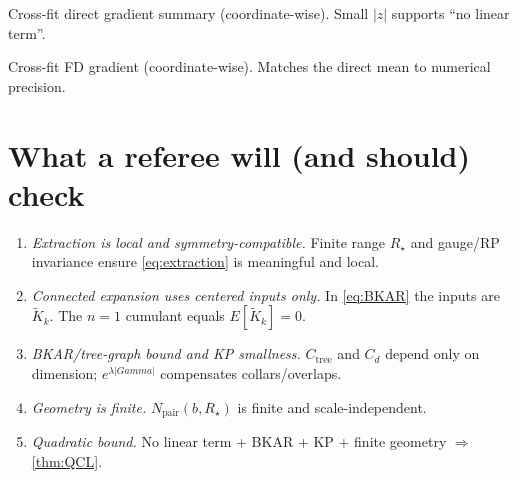 \documentclass[11pt]{article}
\def\Gamma{Gamma}%
\def\E{E}%
\theoremstyle{definition}
\theoremstyle{remark}
\newcommand{\E}{\mathbb{E}}
\newcommand{\1}{\mathbbm{1}}
\newcommand{\abs}[1]{\left\lvert #1 \right\rvert}
\begin{document}
\begin{table}[htbp]
\centering
{}
\caption{Cross-fit direct gradient summary (coordinate-wise). Small $|z|$ supports ``no linear term''.}
\end{table}

\begin{table}[htbp]
\centering
{}
\caption{Cross-fit FD gradient (coordinate-wise). Matches the direct mean to numerical precision.}
\end{table}

\section{What a referee will (and should) check}
\begin{enumerate}[label=\textbf{(\roman*)},leftmargin=2.2em]
\item \emph{Extraction is local and symmetry-compatible.}
Finite range $R_\star$ and gauge/RP invariance ensure \cref{eq:extraction} is meaningful and local.
\item \emph{Connected expansion uses centered inputs only.}
In \cref{eq:BKAR} the inputs are $\widetilde K_k$. The $n=1$ cumulant equals $\E[\widetilde K_k]=0$.
\item \emph{BKAR/tree-graph bound and KP smallness.}
$C_{\mathrm{tree}}$ and $C_d$ depend only on dimension; $e^{\lambda\abs{\Gamma}}$ compensates collars/overlaps.
\item \emph{Geometry is finite.}
$N_{\mathrm{pair}}(b,R_\star)$ is finite and scale-independent.
\item \emph{Quadratic bound.}
No linear term + BKAR + KP + finite geometry $\Rightarrow$ \cref{thm:QCL}.
\end{enumerate}
\end{document}

